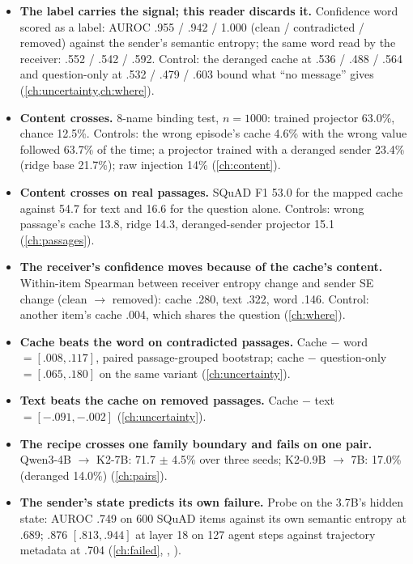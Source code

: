 \documentclass[11pt,a4paper]{report}
\begin{document}
\begin{tcolorbox}[enhanced,breakable,colback=shownc!4,colframe=shownc,boxrule=0.6pt,arc=1pt,title={\textbf{SHOWN} (number, then control)}]
\small
\begin{itemize}[leftmargin=1.2em]
\item \textbf{The label carries the signal; this reader discards it.} Confidence word scored as a label: AUROC .955 / .942 / 1.000 (clean / contradicted / removed) against the sender's semantic entropy; the same word read by the receiver: .552 / .542 / .592. Control: the deranged cache at .536 / .488 / .564 and question-only at .532 / .479 / .603 bound what ``no message'' gives (\cref{ch:uncertainty,ch:where}).
\item \textbf{Content crosses.} 8-name binding test, $n = 1000$: trained projector 63.0\%, chance 12.5\%. Controls: the wrong episode's cache 4.6\% with the wrong value followed 63.7\% of the time; a projector trained with a deranged sender 23.4\% (ridge base 21.7\%); raw injection 14\% (\cref{ch:content}).
\item \textbf{Content crosses on real passages.} SQuAD F1 53.0 for the mapped cache against 54.7 for text and 16.6 for the question alone. Controls: wrong passage's cache 13.8, ridge 14.3, deranged-sender projector 15.1 (\cref{ch:passages}).
\item \textbf{The receiver's confidence moves because of the cache's content.} Within-item Spearman between receiver entropy change and sender SE change (clean $\to$ removed): cache .280, text .322, word .146. Control: another item's cache .004, which shares the question (\cref{ch:where}).
\item \textbf{Cache beats the word on contradicted passages.} Cache $-$ word $= [.008, .117]$, paired passage-grouped bootstrap; cache $-$ question-only $= [.065, .180]$ on the same variant (\cref{ch:uncertainty}).
\item \textbf{Text beats the cache on removed passages.} Cache $-$ text $= [-.091, -.002]$ (\cref{ch:uncertainty}).
\item \textbf{The recipe crosses one family boundary and fails on one pair.} Qwen3-4B $\to$ K2-7B: 71.7 $\pm$ 4.5\% over three seeds; K2-0.9B $\to$ 7B: 17.0\% (deranged 14.0\%) (\cref{ch:pairs}).
\item \textbf{The sender's state predicts its own failure.} Probe on the 3.7B's hidden state: AUROC .749 on 600 SQuAD items against its own semantic entropy at .689; .876 $[.813, .944]$ at layer 18 on 127 agent steps against trajectory metadata at .704 (\cref{ch:failed}, , ).

\end{itemize}
\end{tcolorbox}
\end{document}
